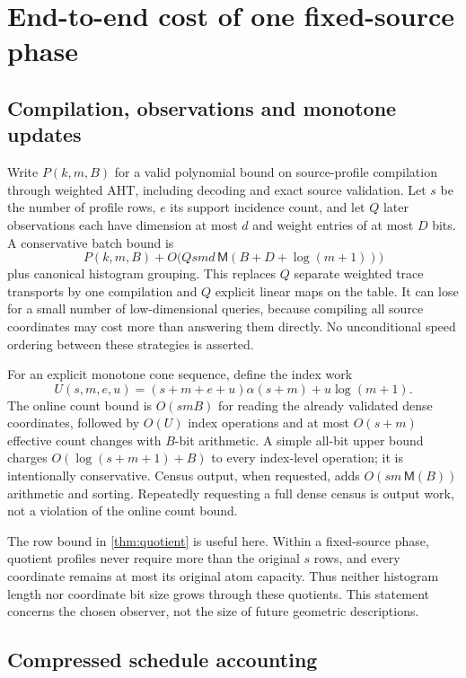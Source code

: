 \section{End-to-end cost of one fixed-source phase}
\label{sec:complexity}

\subsection{Compilation, observations and monotone updates}

Write $P(k,m,B)$ for a valid polynomial bound on source-profile compilation
through weighted AHT, including decoding and exact source validation.
Let $s$ be the number of profile rows, $e$ its support incidence count,
and let $Q$ later observations each have dimension at most $d$ and weight
entries of at most $D$ bits. A conservative batch bound is
\begin{equation}
 P(k,m,B)+O\bigl(Qsmd\,\mathsf M(B+D+\log(m+1))\bigr)
 \label{eq:batch-cost}
\end{equation}
plus canonical histogram grouping. This replaces $Q$ separate weighted
trace transports by one compilation and $Q$ explicit linear maps on the
table. It can lose for a small number of low-dimensional queries, because
compiling all source coordinates may cost more than answering them directly.
No unconditional speed ordering between these strategies is asserted.

For an explicit monotone cone sequence, define the index work
\[
 U(s,m,e,u)=(s+m+e+u)\alpha(s+m)+u\log(m+1).
\]
The online count bound is $O(smB)$ for reading the already validated dense
coordinates, followed by $O(U)$ index operations and at most
$O(s+m)$ effective count changes with $B$-bit arithmetic. A simple all-bit
upper bound charges $O(\log(s+m+1)+B)$ to every index-level operation;
it is intentionally conservative. Census output, when requested, adds
$O(sm\,\mathsf M(B))$ arithmetic and sorting. Repeatedly requesting a full
dense census is output work, not a violation of the online count bound.

The row bound in \cref{thm:quotient} is useful here. Within a fixed-source
phase, quotient profiles never require more than the original $s$ rows,
and every coordinate remains at most its original atom capacity. Thus
neither histogram length nor coordinate bit size grows through these
quotients. This statement concerns the chosen observer, not the size of
future geometric descriptions.

\subsection{Compressed schedule accounting}

